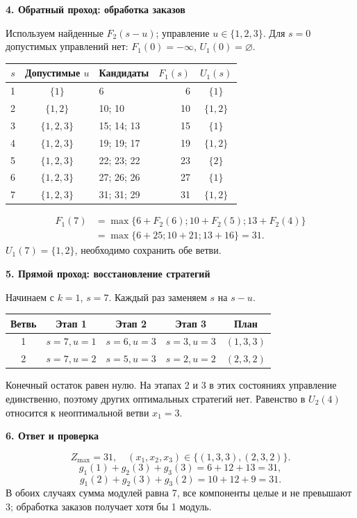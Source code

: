\documentclass[12pt,a4paper]{article}
\newcommand{\head}[1]{\medskip\textbf{#1}\par}
\begin{document}
\newpage
\head{4. Обратный проход: обработка заказов}
Используем найденные $F_2(s-u)$; управление $u\in\{1,2,3\}$.
Для $s=0$ допустимых управлений нет: $F_1(0)=-\infty$, $U_1(0)=\varnothing$.
\begin{center}\begin{tabular}{c|c|l|r|c}
$s$&Допустимые $u$&Кандидаты&$F_1(s)$&$U_1(s)$\\\hline
1&$\{1\}$&6&6&$\{1\}$\\
2&$\{1,2\}$&10; 10&10&$\{1,2\}$\\
3&$\{1,2,3\}$&15; 14; 13&15&$\{1\}$\\
4&$\{1,2,3\}$&19; 19; 17&19&$\{1,2\}$\\
5&$\{1,2,3\}$&22; 23; 22&23&$\{2\}$\\
6&$\{1,2,3\}$&27; 26; 26&27&$\{1\}$\\
7&$\{1,2,3\}$&31; 31; 29&31&$\{1,2\}$
\end{tabular}\end{center}
\begin{align*}
F_1(7)&=\max\{6+F_2(6);10+F_2(5);13+F_2(4)\}\\
&=\max\{6+25;10+21;13+16\}=31.
\end{align*}
$U_1(7)=\{1,2\}$, необходимо сохранить обе ветви.

\head{5. Прямой проход: восстановление стратегий}
Начинаем с $k=1$, $s=7$. Каждый раз заменяем $s$ на $s-u$.
\begin{center}\begin{tabular}{c|c|c|c|c}
Ветвь&Этап 1&Этап 2&Этап 3&План\\\hline
1&$s=7,u=1$&$s=6,u=3$&$s=3,u=3$&$(1,3,3)$\\
2&$s=7,u=2$&$s=5,u=3$&$s=2,u=2$&$(2,3,2)$
\end{tabular}\end{center}
Конечный остаток равен нулю. На этапах 2 и 3 в этих состояниях управление
единственно, поэтому других оптимальных стратегий нет.
Равенство в $U_2(4)$ относится к неоптимальной ветви $x_1=3$.

\head{6. Ответ и проверка}
\[\boxed{Z_{\max}=31,\quad(x_1,x_2,x_3)\in\{(1,3,3),(2,3,2)\}.}\]
\[g_1(1)+g_2(3)+g_3(3)=6+12+13=31,\]
\[g_1(2)+g_2(3)+g_3(2)=10+12+9=31.\]
В обоих случаях сумма модулей равна 7, все компоненты целые и не превышают 3;
обработка заказов получает хотя бы 1 модуль.
\end{document}
